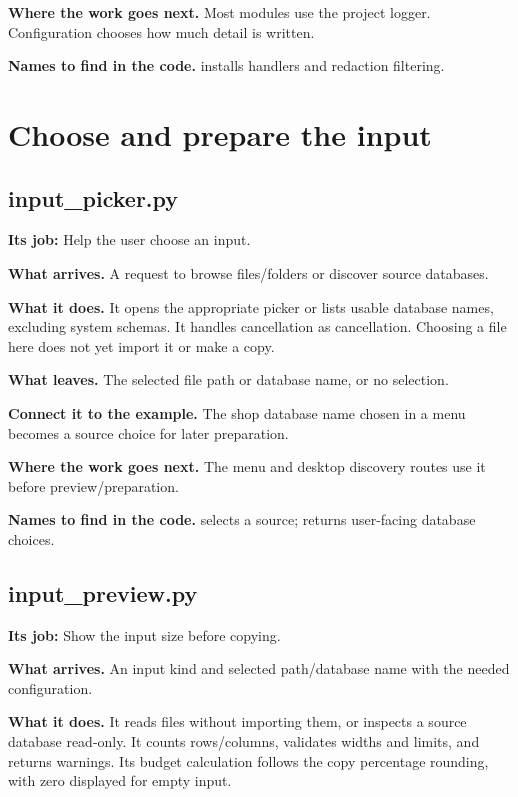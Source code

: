 \textbf{Where the work goes next.} Most modules use the project logger. Configuration chooses how much detail is written.

\textbf{Names to find in the code.}  installs handlers and redaction filtering.

\section{Choose and prepare the input}


\subsection{input\_picker.py}

\textbf{Its job:} Help the user choose an input.

\textbf{What arrives.} A request to browse files/folders or discover source databases.

\textbf{What it does.} It opens the appropriate picker or lists usable database names, excluding system schemas. It handles cancellation as cancellation. Choosing a file here does not yet import it or make a copy.

\textbf{What leaves.} The selected file path or database name, or no selection.

\textbf{Connect it to the example.} The shop database name chosen in a menu becomes a source choice for later preparation.

\textbf{Where the work goes next.} The menu and desktop discovery routes use it before preview/preparation.

\textbf{Names to find in the code.}  selects a source;  returns user-facing database choices.


\subsection{input\_preview.py}

\textbf{Its job:} Show the input size before copying.

\textbf{What arrives.} An input kind and selected path/database name with the needed configuration.

\textbf{What it does.} It reads files without importing them, or inspects a source database read-only. It counts rows/columns, validates widths and limits, and returns warnings. Its budget calculation follows the copy percentage rounding, with zero displayed for empty input.

